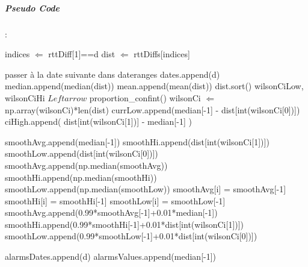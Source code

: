 \subparagraph{Pseudo Code} :
\newpage
\begin{algorithm}[H]
		\caption{}
 	\begin{algorithmic}[1]

		
		\State indices $\Leftarrow$  rttDiff[1]==d  \label{prepare-start} 
	    \State dist $\Leftarrow$ rttDiffs[indices]  
	     
	      \State passer à la date suivante dans dateranges
	    \EndIf
	    \State dates.append(d) 
	     \State median.append(median(dist)) 
	     \State mean.append(mean(dist))
	     \State dist.sort()
	     \State  wilsonCiLow, wilsonCiHi  $Leftarrow$   proportion\_confint()  
	     \State wilsonCi $\Leftarrow$ np.array(wilsonCi)*len(dist)
	     \State currLow.append(median[-1] - dist[int(wilsonCi[0])])  
	     \State ciHigh.append( dist[int(wilsonCi[1])] - median[-1] ) \label{prepare-end} 
	     
	         
             \State  smoothAvg.append(median[-1])
               \State smoothHi.append(dist[int(wilsonCi[1])])
               \State smoothLow.append(dist[int(wilsonCi[0])])
	                 \State smoothAvg.append(np.median(smoothAvg))
	                 \State smoothHi.append(np.median(smoothHi))
	                 \State smoothLow.append(np.median(smoothLow))
	                  \State   smoothAvg[i] = smoothAvg[-1]
	                  \State   smoothHi[i] = smoothHi[-1]
	                  \State  smoothLow[i] = smoothLow[-1]
	                  \EndFor
	     \Else
	                 \State smoothAvg.append(0.99*smoothAvg[-1]+0.01*median[-1])
	                 \State smoothHi.append(0.99*smoothHi[-1]+0.01*dist[int(wilsonCi[1])])
	                 \State smoothLow.append(0.99*smoothLow[-1]+0.01*dist[int(wilsonCi[0])])
	                  

	                 
	                       \State       alarmsDates.append(d)
	                       \State alarmsValues.append(median[-1])
	                 \EndIf
	                 
	                            
	     \EndIf
	    
	    \State 
	\EndFor

\end{algorithmic}
\label{algo:rttevolutionLink}
\end{algorithm}





